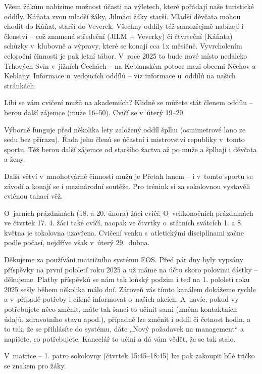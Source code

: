 \documentclass[11pt]{article}
\begin{document}
Všem žákům nabízíme možnost účasti na výletech, které pořádají naše turistické oddíly. Káňata zvou mladší žáky, Jilmáci žáky starší. Mladší děvčata mohou chodit do Káňat, starší do Veverek. Všechny oddíly též samozřejmě nabízejí i členství – což znamená středeční (JILM + Veverky) či čtvrteční (Káňata) schůzky v~klubovně a výpravy, které se konají cca 1x měsíčně. Vyvrcholením celoroční činnosti je pak letní tábor. V~roce 2025 to bude nové místo nedaleko Trhových Svin v~jižních Čechách – na Keblanském potoce mezi obcemi Něchov a Keblany. Informace u~vedoucích oddílů – viz informace u~oddílů na našich stránkách. 

Líbí se vám cvičení mužů na akademiích? Klidně se můžete stát členem oddílu – berou další zájemce (muže 16–50). Cvičí se v~úterý 19–20. 

Výborně funguje před několika lety založený oddíl šplhu (osmimetrové lano ze sedu bez přírazu). Řada jeho členů se účastní i mistrovství republiky v~tomto sportu. Též berou další zájemce od staršího žactva až po muže a šplhají i děvčata a ženy. 

Další větví v~mnohotvárné činnosti mužů je Přetah lanem – i v~tomto sportu se závodí a konají se i mezinárodní soutěže. Pro trénink si za sokolovnou vystavěli cvičnou tahací věž.

O~jarních prázdninách (18. a 20. února) žáci cvičí. O~velikonočních prázdninách ve čtvrtek 17. 4. žáci také cvičí, naopak ve čtvrtky o~státních svátcích 1. a 8. května je sokolovna uzavřena. 
Cvičení venku s~atletickými disciplínami začne podle počasí, nejdříve však v~úterý 29.~dubna.

Děkujeme za používání matričního systému EOS. Před pár dny byly vypsány příspěvky na první pololetí roku 2025 a už máme na účtu skoro polovinu částky – děkujeme. Platby příspěvků se nám tak loňský podzim i teď na 1. pololetí roku 2025 sešly během několika málo dní. 
Zároveň vás tímto kanálem dokážeme rychle a v~případě potřeby i cíleně informovat o~našich akcích. A~navíc, pokud vy potřebujete něco změnit, máte tak šanci to učinit sami (změna kontaktních údajů, zdravotního stavu apod.), případně lze změnit i oddíl či četnost hodin, a to tak, že se přihlásíte do systému, dáte „Nový požadavek na management“ a napíšete, co potřebujete. Kancelář to učiní a dá vám vědět, že se tak stalo. 

V~matrice – 1. patro sokolovny (čtvrtek 15:45–18:45) lze pak zakoupit bílé tričko se znakem pro žáky.
\end{document}
